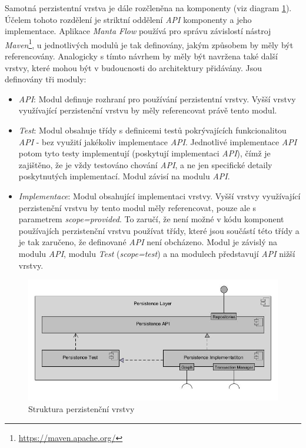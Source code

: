 Samotná perzistentní vrstva je dále rozčleněna na komponenty (viz diagram \ref{fig:des-persistence}). Účelem tohoto rozdělení je striktní oddělení \textit{API} komponenty a jeho implementace. Aplikace \textit{Manta Flow} používá pro správu závislostí nástroj \textit{Maven}\footnote{\url{https://maven.apache.org/}}, u jednotlivých modulů je tak definovány, jakým způsobem by měly být referencovány. Analogicky s tímto návrhem by měly být navržena také další vrstvy, které mohou být v budoucnosti do architektury přidávány. Jsou definovány tři moduly:

\begin{itemize}
   \item{\textit{API}}: Modul definuje rozhraní pro používání perzistentní vrstvy. Vyšší vrstvy využívající perzistenční vrstvu by měly referencovat právě tento modul.
   \item{\textit{Test}}: Modul obsahuje třídy s definicemi testů pokrývajících funkcionalitou \textit{API} - bez využití jakékoliv implementace \textit{API}. Jednotlivé implementace \textit{API} potom tyto testy implementují (poskytují implementaci \textit{API}), čímž je zajištěno, že je vždy testováno chování \textit{API}, a ne jen specifické detaily poskytnutých implementací. Modul závisí na modulu \textit{API}.
   \item{\textit{Implementace}}: Modul obsahující implementaci vrstvy. Vyšší vrstvy využívající perzistenční vrstvu by tento modul měly referencovat, pouze ale s parametrem \textit{scope=provided}. To zaručí, že není možné v kódu komponent používajích perzistenční vrstvu používat třídy, které jsou součástí této třídy a je tak zaručeno, že definované \textit{API} není obcházeno. Modul je závislý na modulu \textit{API}, modulu \textit{Test} (\textit{scope=test}) a na modulech představují \textit{API} nižší vrstvy.
\end{itemize}

\begin{figure}
\begin{center}
\includegraphics[width=12cm]{figures/persistance_module}
\caption{Struktura perzistenční vrstvy}
\label{fig:des-persistence}
\end{center}
\end{figure}

